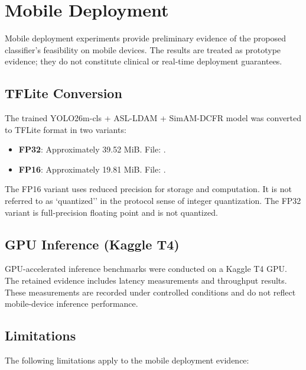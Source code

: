 
\section{Mobile Deployment}
\label{sec:mobile}

Mobile deployment experiments provide preliminary evidence of the proposed classifier's feasibility on mobile devices. The results are treated as prototype evidence; they do not constitute clinical or real-time deployment guarantees.

\subsection{TFLite Conversion}
\label{sec:tflite-conversion}

The trained YOLO26m-cls + ASL-LDAM + SimAM-DCFR model was converted to TFLite format in two variants:

\begin{itemize}
    \item \textbf{FP32}: Approximately 39.52 MiB. File: .
    \item \textbf{FP16}: Approximately 19.81 MiB. File: .
\end{itemize}

The FP16 variant uses reduced precision for storage and computation. It is not referred to as `quantized'' in the protocol sense of integer quantization. The FP32 variant is full-precision floating point and is not quantized.

\subsection{GPU Inference (Kaggle T4)}
\label{sec:t4-inference}

GPU-accelerated inference benchmarks were conducted on a Kaggle T4 GPU. The retained evidence includes latency measurements and throughput results. These measurements are recorded under controlled conditions and do not reflect mobile-device inference performance.

\subsection{Limitations}
\label{sec:mobile-limitations}

The following limitations apply to the mobile deployment evidence:

